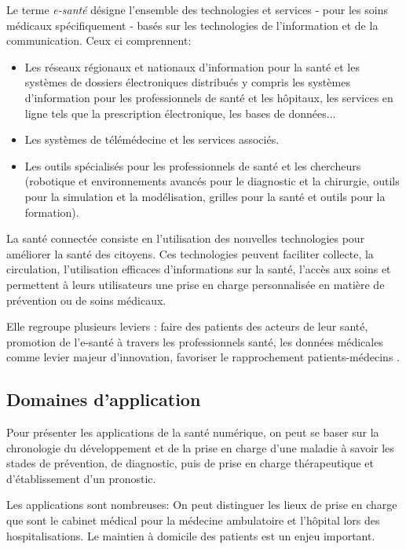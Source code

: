 \documentclass[12pt]{article}
\begin{document}
Le terme \textit{e-santé} désigne l'ensemble des technologies et services - pour les soins médicaux spécifiquement - basés sur les technologies de l'information et de la communication. 
Ceux ci comprennent:
\begin{itemize}
	\item Les réseaux régionaux et nationaux d'information pour la santé et les systèmes de dossiers électroniques distribués y compris les systèmes d'information pour les professionnels de santé et les hôpitaux, les services en ligne tels que la prescription électronique, les bases de données...
	\item Les systèmes de télémédecine et les services associés.
	\item Les outils spécialisés pour les professionnels de santé et les chercheurs (robotique et environnements avancés pour le diagnostic et la chirurgie, outils pour la simulation et la modélisation, grilles pour la santé et outils pour la formation).
\end{itemize}

La santé connectée consiste en l’utilisation des nouvelles technologies pour améliorer la santé des citoyens. Ces technologies peuvent faciliter collecte, la circulation, l'utilisation efficaces d'informations sur la santé, l’accès aux soins et permettent à leurs utilisateurs une prise en charge personnalisée en matière de prévention ou de soins médicaux.

Elle regroupe plusieurs leviers : faire des patients des acteurs de leur santé, promotion de l’e-santé à travers les professionnels santé, les données médicales comme levier majeur d’innovation, favoriser le rapprochement patients-médecins \cite{27}.

\subsection{Domaines d’application}
Pour présenter les applications de la santé numérique, on peut se baser sur la chronologie du développement et de la prise en charge d’une maladie à savoir les stades de prévention, de diagnostic, puis de prise en charge thérapeutique et d’établissement d’un pronostic.

Les applications sont nombreuses: On peut distinguer les lieux de prise en charge que sont le cabinet médical pour la médecine ambulatoire et l’hôpital lors des hospitalisations. Le maintien à domicile des patients est un enjeu important.
\end{document}
